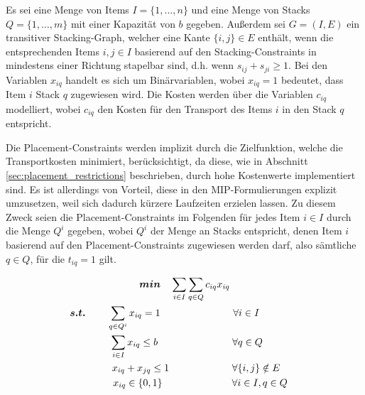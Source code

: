 Es sei eine Menge von Items $I = \{1, \dotsc, n\}$ und eine Menge von Stacks $Q = \{1, \dotsc, m\}$ mit einer Kapazität von $b$ gegeben. Außerdem sei $G = (I, E)$ ein transitiver Stacking-Graph, welcher eine Kante $\{i, j\} \in E$ enthält,
wenn die entsprechenden Items $i, j \in I$ basierend auf den Stacking-Constraints in mindestens einer Richtung stapelbar sind,
d.h. wenn $s_{ij} + s_{ji} \geq 1$.
Bei den Variablen $x_{iq}$ handelt es sich um Binärvariablen, wobei $x_{iq} = 1$ bedeutet, dass Item $i$ Stack $q$ zugewiesen wird. Die Kosten werden über die Variablen $c_{iq}$ modelliert, wobei $c_{iq}$ den Kosten für den Transport des Items $i$ in den Stack $q$ entspricht.

Die Placement-Constraints werden implizit durch die Zielfunktion, welche die Transportkosten minimiert, berücksichtigt,
da diese, wie in Abschnitt \ref{sec:placement_restrictions} beschrieben, durch hohe Kostenwerte implementiert sind.
Es ist allerdings von Vorteil, diese in den MIP-Formulierungen explizit umzusetzen, weil sich dadurch kürzere
Laufzeiten erzielen lassen. Zu diesem Zweck seien die Placement-Constraints im Folgenden für jedes Item $i \in I$
durch die Menge $Q^i$ gegeben, wobei $Q^i$ der Menge an Stacks entspricht, denen Item $i$ basierend auf den Placement-Constraints zugewiesen werden darf, also sämtliche $q \in Q$, für die $t_{iq} = 1$ gilt.

\vfill
\pagebreak

\begin{gather}
\boldsymbol{min} \quad \sum_{i \in I} \sum_{q \in Q} c_{iq} x_{iq} \label{bin_packing_line_one} \\
\thinspace\thinspace \boldsymbol{s.t.} \thinspace\quad \quad \sum_{q \in Q^i} x_{iq} = 1 \thinspace\thinspace\quad\quad\quad\quad\quad\quad\quad \forall i \in I \quad\quad\quad\quad\thinspace\thinspace \label{bin_packing_line_two} \\
\thinspace\thinspace\thinspace\thinspace\thinspace \sum_{i \in I} x_{iq} \leq b \thinspace\thinspace\thinspace \quad\quad\quad\quad\quad\quad\quad \forall q \in Q \thinspace\thinspace \label{bin_packing_line_three} \\
\thinspace\thinspace\quad\quad x_{iq} + x_{jq} \leq 1 \quad\quad\thinspace\thinspace\quad\quad\quad\quad \forall \{i, j\} \notin E \label{bin_packing_line_four} \\
\thinspace\thinspace\quad\quad\quad x_{iq} \in \{0, 1\} \thinspace\thinspace\thinspace\thinspace\thinspace\thinspace\quad\quad\quad\quad\quad\quad \forall i \in I, q \in Q \thinspace \label{bin_packing_line_five}
\end{gather}

